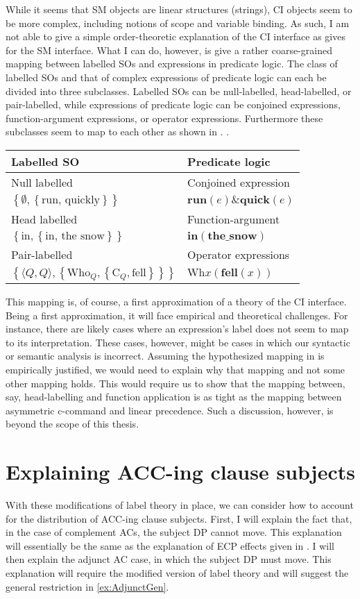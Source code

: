 \documentclass[MilwayThesis]{subfiles}
\begin{document}
While it seems that SM objects are linear structures (strings), CI objects seem to be more complex, including notions of scope and variable binding.
As such, I am not able to give a simple order-theoretic explanation of the CI interface as \textcite{kayne1994antisymmetry} gives for the SM interface.
What I can do, however, is give a rather coarse-grained mapping between labelled SOs and expressions in predicate logic.
The class of labelled SOs and that of complex expressions of predicate logic can each be divided into three subclasses.
Labelled SOs can be null-labelled, head-labelled, or pair-labelled, while expressions of predicate logic can be conjoined expressions, function-argument expressions, or operator expressions.
Furthermore these subclasses seem to map to each other as shown in \Next.
\ex.
\begin{tabular}[t]{ll}
	Labelled SO & Predicate logic\\
	\hline
	\hline
	Null labelled & Conjoined expression\\
	$\left\{ \emptyset, \left\{ \text{run, quickly} \right\} \right\}$ & $\textbf{run}(e) \& \textbf{quick}(e)$\\
	\hline
	Head labelled & Function-argument\\
	$\left\{ \text{in}, \left\{ \text{in, the snow} \right\} \right\}$ & $\textbf{in}(\textbf{the\_snow})$\\
	\hline
	Pair-labelled & Operator expressions\\
	$\left\{ \langle Q,Q\rangle, \left\{\text{Who}_Q, \left\{\text{C}_Q, \text{fell} \right\}  \right\} \right\}$ & $\text{Wh}x(\textbf{fell}(x))$\\
	\hline
\end{tabular}

This mapping is, of course, a first approximation of a theory of the CI interface.
Being a first approximation, it will face empirical and theoretical challenges.
For instance, there are likely cases where an expression's label does not seem to map to its interpretation.
These cases, however, might be cases in which our syntactic or semantic analysis is incorrect.
Assuming the hypothesized mapping in \Last is empirically justified, we would need to explain why that mapping and not some other mapping holds.
This would require us to show that the mapping between, say, head-labelling and function application is as tight as the mapping between asymmetric c-command and linear precedence.
Such a discussion, however, is beyond the scope of this thesis.
\section{Explaining ACC-ing clause subjects}
With these modifications of label theory in place, we can consider how to account for the distribution of ACC-ing clause subjects.
First, I will explain the fact that, in the case of complement ACs, the subject DP cannot move.
This explanation will essentially be the same as the explanation of ECP effects given in \cite{chomsky2015problems}.
I will then explain the adjunct AC case, in which the subject DP must move.
This explanation will require the modified version of label theory and will suggest the general restriction in \cref{ex:AdjunctGen}.
\end{document}
